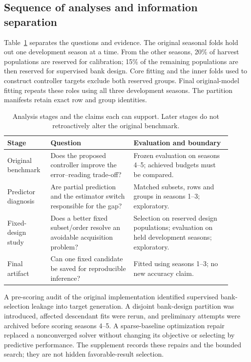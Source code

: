 \documentclass[11pt,a4paper]{article}
\begin{document}
\subsection{Sequence of analyses and information separation}
Table~\ref{tab:stages} separates the questions and evidence. The original seasonal folds hold out one development season at a time. From the other seasons, 20\% of harvest populations are reserved for calibration; 15\% of the remaining populations are then reserved for supervised bank design. Core fitting and the inner folds used to construct controller targets exclude both reserved groups. Final original-model fitting repeats these roles using all three development seasons. The partition manifests retain exact row and group identities.

\begin{table}[tbp]
\centering\small
\caption{Analysis stages and the claims each can support. Later stages do not retroactively alter the original benchmark.}\label{tab:stages}
\begin{tabular}{>{\raggedright\arraybackslash}p{0.17\linewidth}>{\raggedright\arraybackslash}p{0.34\linewidth}>{\raggedright\arraybackslash}p{0.40\linewidth}}
\toprule
Stage & Question & Evaluation and boundary \\
\midrule
Original benchmark & Does the proposed controller improve the error--reading trade-off? & Frozen evaluation on seasons 4--5; achieved budgets must be compared. \\
Predictor diagnosis & Are partial prediction and the estimator switch responsible for the gap? & Matched subsets, rows and groups in seasons 1--3; exploratory. \\
Fixed-design study & Does a better fixed subset/order resolve an avoidable acquisition problem? & Selection on reserved design populations; evaluation on held development seasons; exploratory. \\
Final artifact & Can one fixed candidate be saved for reproducible inference? & Fitted using seasons 1--3; no new accuracy claim. \\
\bottomrule
\end{tabular}
\end{table}

A pre-scoring audit of the original implementation identified supervised bank-selection leakage into target generation. A disjoint bank-design partition was introduced, affected descendant fits were rerun, and preliminary attempts were archived before scoring seasons 4--5. A sparse-baseline optimization repair replaced a nonconverged solver without changing its objective or selecting by predictive performance. The supplement records these repairs and the bounded search; they are not hidden favorable-result selection.
\end{document}
